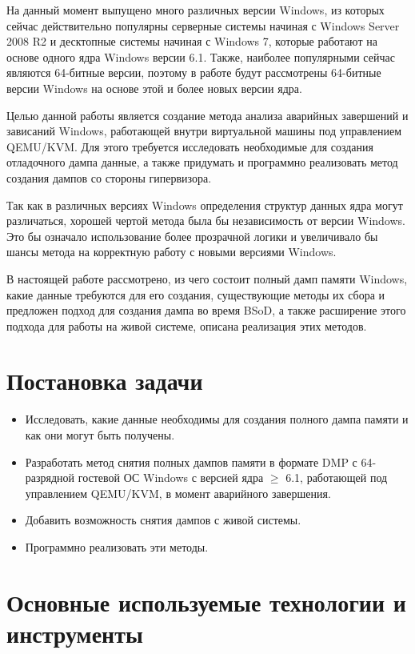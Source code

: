 \documentclass{mipt-thesis-bs}
\begin{document}
На данный момент выпущено много различных версии Windows, из которых сейчас действительно популярны серверные системы начиная с Windows Server 2008 R2 и десктопные системы начиная с Windows 7, которые работают на основе одного ядра Windows версии 6.1. Также, наиболее популярными сейчас являются 64-битные версии, поэтому в работе будут рассмотрены 64-битные версии Windows на основе этой и более новых версии ядра.

Целью данной работы является создание метода анализа аварийных завершений и зависаний Windows, работающей внутри виртуальной машины под управлением QEMU/KVM. Для этого требуется исследовать необходимые для создания отладочного дампа данные, а также придумать и программно реализовать метод создания дампов со стороны гипервизора.

Так как в различных версиях Windows определения структур данных ядра могут различаться\cite{kprcb}\cite{win10-struct}, хорошей чертой метода была бы независимость от версии Windows. Это бы означало использование более прозрачной логики и увеличивало бы шансы метода на корректную работу с новыми версиями Windows.

В настоящей работе рассмотрено, из чего состоит полный дамп памяти Windows, какие данные требуются для его создания, существующие методы их сбора и предложен подход для создания дампа во время BSoD, а также расширение этого подхода для работы на живой системе, описана реализация этих методов.

\chapter{Постановка задачи}

\begin{itemize}
\item Исследовать, какие данные необходимы для создания полного дампа памяти и как они могут быть получены.
\item Разработать метод снятия полных дампов памяти в формате DMP с 64-разрядной гостевой ОС Windows с версией ядра $\geqslant$ 6.1, работающей под управлением QEMU/KVM, в момент аварийного завершения.
\item Добавить возможность снятия дампов с живой системы.
\item Программно реализовать эти методы.
\end{itemize}

\chapter{Основные используемые технологии и инструменты}
\end{document}
